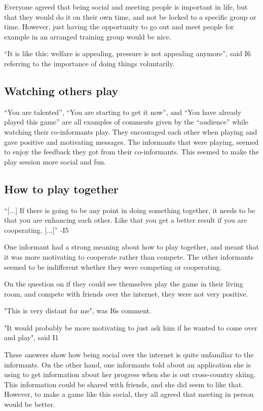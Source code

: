 Everyone agreed that being social and meeting people is important in life, but that they would do it on their own time, and not be locked to a specific group or time. However, just having the opportunity to go out and meet people for example in an arranged training group would be nice. 

“It is like this: welfare is appealing, pressure is not appealing anymore”, said I6 referring to the importance of doing things voluntarily. 

\subsection{Watching others play}
“You are talented”, “You are starting to get it now”, and “You have already played this game” are all examples of comments given by the “audience” while watching their co-informants play. They encouraged each other when playing and gave positive and motivating messages. The informants that were playing, seemed to enjoy the feedback they got from their co-informants. This seemed to make the play session more social and fun.  

\subsection{How to play together}
“[...] If there is going to be any point in doing something together, it needs to be that you are enhancing each other. Like that you get a better result if you are cooperating. [...]” -I5

One informant had a strong meaning about how to play together, and meant that it was more motivating to cooperate rather than compete. The other informants seemed to be indifferent whether they were competing or cooperating.

On the question on if they could see themselves play the game in their living room, and compete with friends over the internet, they were not very positive.

"This is very distant for me", was I6s comment.

"It would probably be more motivating to just ask him if he wanted to come over and play", said I1

These answers show how being social over the internet is quite unfamiliar to the informants. On the other hand, one informants told about an application she is using to get information about her progress when she is out cross-country skiing. This information could be shared with friends, and she did seem to like that. However, to make a game like this social, they all agreed that meeting in person would be better.

